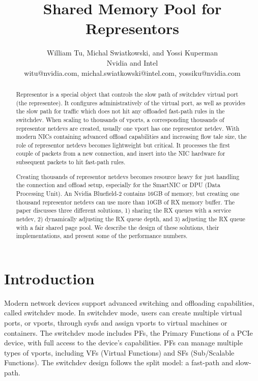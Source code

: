 \documentclass[letterpaper]{article}
\title{Shared Memory Pool for Representors}
\author{William Tu, Michal Swiatkowski, and Yossi Kuperman\\
Nvidia and Intel\\
witu@nvidia.com, michal.swiatkowski@intel.com, yossiku@nvidia.com\\
\newline
\newline
}
\begin{document}
 
\maketitle

\begin{abstract}
Representor is a special object that controls the slow path of
switchdev virtual port (the representee). It configures administratively
of the virtual port, as well as provides the slow path for traffic which
does not hit any offloaded fast-path rules in the switchdev.
When scaling to thousands of vports, a corresponding thousands of
representor netdevs are created, usually one vport has one representor
netdev. With modern NICs containing advanced offload capabilities
and increasing flow tale size, the role of representor netdevs becomes
lightweight but critical. It processes the first couple of packets
from a new connection, and insert into the NIC hardware for
subsequent packets to hit fast-path rules. 

Creating thousands of representor netdevs becomes resource heavy for
just handling the connection and offload setup, especially for the SmartNIC or
DPU (Data Processing Unit). An Nvidia Bluefield-2 contains 16GB
of memory, but creating one thousand representor netdevs can use
more than 10GB of RX memory buffer.
The paper discusses three different solutions, 1) sharing the RX queues
with a service netdev, 2) dynamically adjusting the RX queue depth,
and 3) adjusting the RX queue with a fair shared page pool.
We describe the design of these solutions, their implementations,
and present some of the performance numbers.

\end{abstract}

\section{Introduction}
Modern network devices support advanced switching and offloading
capabilities, called switchdev mode. In switchdev mode, users can
create multiple virtual ports, or vports, through sysfs and assign
vports to virtual machines or containers. The switchdev mode includes
PFs, the Primary Functions of a PCIe device, with full access to the device's
capabilities. PFs can manage multiple types of vports, including
VFs (Virtual Functions) and SFs (Sub/Scalable Functions).
The switchdev design follows the split model: a fast-path and
slow-path.
\end{document}
